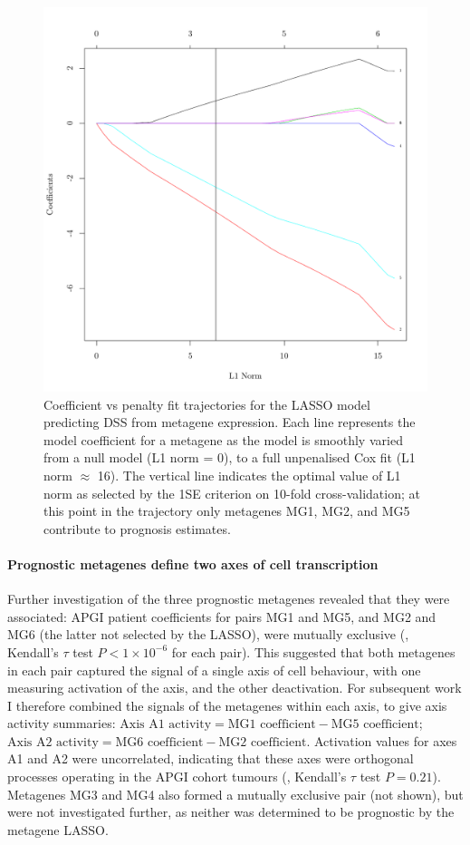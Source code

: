 \documentclass[dissertation.tex]{subfiles}
\begin{document}
\begin{figure}
\centering
\includegraphics[width=.7\linewidth]{analysis/biosurv/reports/18_SIS_diag_dsd_final/figure/nmf-metagene-glmnet-plots-2}
\caption[Fit trajectory of the \acrshort{LASSO} predicting \acrshort{DSS} from metagene coefficients]{Coefficient vs penalty fit trajectories for the \acrshort{LASSO} model predicting \gls{DSS} from metagene expression.  Each line represents the model coefficient for a metagene as the model is smoothly varied from a null model (L1 norm = 0), to a full unpenalised Cox fit (L1 norm $\approx$ 16).  The vertical line indicates the optimal value of L1 norm as selected by the 1SE criterion on 10-fold cross-validation; at this point in the trajectory only metagenes MG1, MG2, and MG5 contribute to prognosis estimates.}\label{fig:sigs-resub-lasso-track}
\end{figure}

\paragraph{Prognostic metagenes define two axes of cell transcription}
Further investigation of the three prognostic metagenes revealed that they were associated: \gls{APGI} patient coefficients for pairs MG1 and MG5, and MG2 and MG6 (the latter not selected by the \gls{LASSO}), were mutually exclusive (, Kendall's $\tau$ test $P < 1 \times 10^{-6}$ for each pair).  This suggested that both metagenes in each pair captured the signal of a single axis of cell behaviour, with one measuring activation of the axis, and the other deactivation.  For subsequent work I therefore combined the signals of the metagenes within each axis, to give axis activity summaries: $\text{Axis A1 activity} = \text{MG1 coefficient} - \text{MG5 coefficient}$; $\text{Axis A2 activity} = \text{MG6 coefficient} - \text{MG2 coefficient}$.  Activation values for axes A1 and A2 were uncorrelated, indicating that these axes were orthogonal processes operating in the \gls{APGI} cohort tumours (, Kendall's $\tau$ test $P = 0.21$).  Metagenes MG3 and MG4 also formed a mutually exclusive pair (not shown), but were not investigated further, as neither was determined to be prognostic by the metagene \gls{LASSO}.
\end{document}
